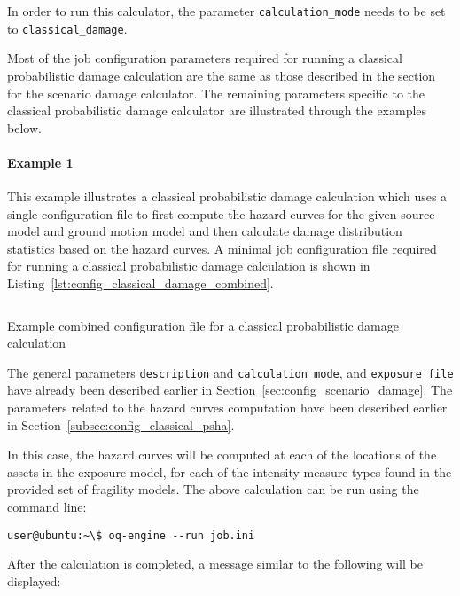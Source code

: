 In order to run this calculator, the parameter \Verb+calculation_mode+ needs
to be set to \Verb+classical_damage+.

Most of the job configuration parameters required for running a classical
probabilistic damage calculation are the same as those described in the
section for the scenario damage calculator. The remaining parameters specific
to the classical probabilistic damage calculator are illustrated through the
examples below.

\paragraph{Example 1}

This example illustrates a classical probabilistic damage calculation which
uses a single configuration file to first compute the hazard curves for the
given source model and ground motion model and then calculate damage
distribution statistics based on the hazard curves. A minimal job
configuration file required for running a classical probabilistic damage
calculation is shown in Listing~\ref{lst:config_classical_damage_combined}.

\begin{listing}[htbp]
  \inputminted[firstline=1,firstnumber=1,fontsize=\footnotesize,frame=single,linenos,bgcolor=lightgray,label=job.ini]{ini}{oqum/risk/verbatim/config_classical_damage_combined.ini}
  \caption{Example combined configuration file for a classical probabilistic damage calculation}
  \label{lst:config_classical_damage_combined}
\end{listing}

The general parameters \Verb+description+ and \Verb+calculation_mode+, and
\Verb+exposure_file+ have already been described earlier in
Section~\ref{sec:config_scenario_damage}. The parameters related to the
hazard curves computation have been described earlier in
Section~\ref{subsec:config_classical_psha}.

In this case, the hazard curves will be computed at each of the locations of
the assets in the exposure model, for each of the intensity measure types
found in the provided set of fragility models. The above calculation can be
run using the command line:

\begin{verbatim}
user@ubuntu:~\$ oq-engine --run job.ini
\end{verbatim}

After the calculation is completed, a message similar to the following will be
displayed:

